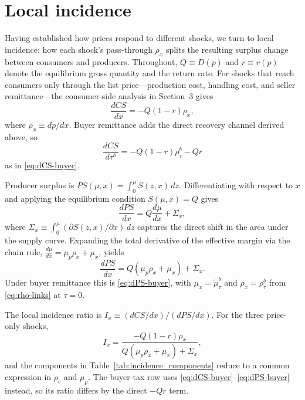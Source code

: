 \documentclass[11pt]{article}
\begin{document}
\section{Local incidence}

Having established how prices respond to different shocks, we turn to local
incidence: how each shock's pass-through $\rho_x$ splits the resulting surplus
change between consumers and producers.  Throughout, $Q\equiv D(p)$ and
$r\equiv r(p)$ denote the equilibrium gross quantity and the return rate.
For shocks that reach consumers only through the list price---production
cost, handling cost, and seller remittance---the consumer-side analysis in
Section~3 gives
\begin{equation}
  \frac{dCS}{dx} = -Q(1-r)\rho_x,
  \label{eq:CSx_incidence}
\end{equation}
where $\rho_x\equiv dp/dx$.  Buyer remittance adds the direct recovery channel
derived above, so
\begin{equation}
  \frac{dCS}{d\tau^{b}}
  =-Q(1-r)\rho^{b}_{\tau}-Qr
\end{equation}
as in \eqref{eq:dCS-buyer}.

Producer surplus is $PS(\mu,x)=\int_0^{\mu} S(z,x)\,dz$.  Differentiating with
respect to $x$ and applying the equilibrium condition $S(\mu,x)=Q$ gives
\[
  \frac{dPS}{dx}
  = Q\frac{d\mu}{dx} + \Sigma_x,
\]
where $\Sigma_x\equiv\int_0^\mu (\partial S(z,x)/\partial x)\,dz$ captures the
direct shift in the area under the supply curve.  Expanding the total
derivative of the effective margin via the chain rule,
$\frac{d\mu}{dx} = \mu_p \rho_x + \mu_x$, yields
\begin{equation}
  \frac{dPS}{dx} = Q(\mu_p \rho_x + \mu_x) + \Sigma_x.
  \label{eq:PSx_incidence}
\end{equation}
Under buyer remittance this is \eqref{eq:dPS-buyer}, with
$\mu_x=\tilde{\mu}^{b}_{\tau}$ and $\rho_x=\rho^{b}_{\tau}$ from
\eqref{eq:rho-links} at $\tau=0$.

The local incidence ratio is $I_x \equiv (dCS/dx)/(dPS/dx)$.  For the three
price-only shocks,
\[
  I_x = \frac{-Q(1-r)\rho_x}{Q(\mu_p \rho_x + \mu_x) + \Sigma_x},
\]
and the components in Table~\ref{tab:incidence_components} reduce to a common
expression in $\rho_c$ and $\mu_p$.  The buyer-tax row uses
\eqref{eq:dCS-buyer}--\eqref{eq:dPS-buyer} instead, so its ratio differs by the
direct $-Qr$ term.
\end{document}
